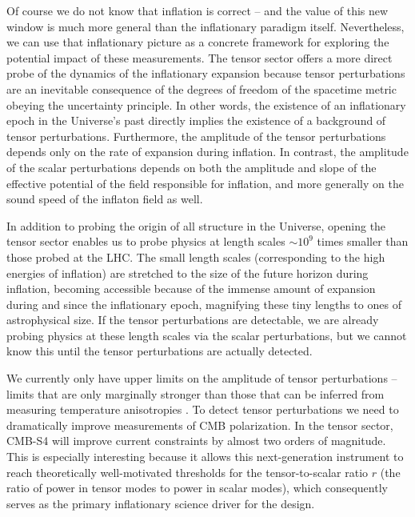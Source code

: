 Of course we do not know that inflation is correct -- and the value of this new window is much more general than the inflationary paradigm itself.  Nevertheless, we can use that inflationary picture as a concrete framework for exploring the potential impact of these measurements. The tensor sector offers a more direct probe of the dynamics of the inflationary expansion because tensor perturbations are an inevitable consequence of the degrees of freedom of the spacetime metric obeying the uncertainty principle. In other words, the existence of an inflationary epoch in the Universe's past directly implies the existence of a background of tensor perturbations. Furthermore, the amplitude of the tensor perturbations depends only on the rate of expansion during inflation. In contrast, the amplitude of the scalar perturbations depends on both the amplitude and slope of the effective potential of the field responsible for inflation, and more generally on the sound speed of the inflaton field as well.

In addition to probing the origin of all structure in the Universe, opening the tensor sector enables us to probe physics at length scales $\sim 10^9$ times smaller than those probed at the LHC. The small length scales (corresponding to the high energies of inflation) are stretched to the size of the future horizon during inflation, becoming accessible because of the immense amount of expansion during and since the inflationary epoch, magnifying these tiny lengths to ones of astrophysical size. If the tensor perturbations are detectable, we are already probing physics at these length scales via the scalar perturbations, but we cannot know this until the tensor perturbations are actually detected.

We currently only have upper limits on the amplitude of tensor perturbations -- limits that are only marginally stronger than those that can be inferred from measuring temperature anisotropies \cite{Ade:2015lrj,Array:2015xqh}. To detect tensor perturbations we need to dramatically improve measurements of CMB polarization. %
In the tensor sector, CMB-S4 will improve current constraints by almost two orders of magnitude. This is especially interesting because it allows this next-generation instrument to reach theoretically well-motivated thresholds for the tensor-to-scalar ratio $r$ (the ratio of power in tensor modes to power in scalar modes), which consequently serves as the primary inflationary science driver for the design. 

